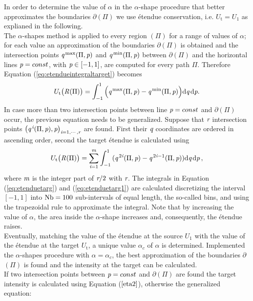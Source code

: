 In order to determine the value of $\alpha$ in the $\alpha$-shape procedure that better approximates the boundaries $\partial$$(\Pi)$ we use \'{e}tendue conservation, i.e. $U_{\textrm{t}}= U_1$ as explianed in the following.\\ \indent
The $\alpha$-shapes method is applied to every region $(\Pi)$ for a range of values of $\alpha$;
   for each value an approximation of the boundaries $\partial$$(\Pi)$ is obtained and
   the intersection points $\textit{q}^{\textrm{\,max}}(\Pi,\textit{p})$ and $\textit{q}^{\textrm{\,min}}(\Pi,\textit{p})$ between $\partial$$(\Pi)$
and the horizontal lines $\textit{p}=const$, with $\textit{p}\in[-1,1]$, are computed for every path $\Pi$.
Therefore Equation (\ref{eq:etendueintegraltarget}) becomes
\begin{equation}\label{eq:etenduetarg}
 U_\textrm{t}\big(\mbox{$\emph{R}_{\textit{}}$}(\Pi)\big)= \int_{-1}^{1}{\Big(\textit{q}^{\textrm{\,max}}(\Pi,\textit{p})-\textit{q}^{\textrm{\,min}}(\Pi,\textit{p})\Big)} \textrm{d}\textit{q}\,\textrm{d}\textit{p}.
\end{equation} In case more than two intersection points between line $\textit{p}=const$ and $\partial$$(\Pi)$ occur, the previous equation needs to be generalized. Suppose that $\textit{r}$ intersection points $\big(\textit{q}^{\,\textit{i}}(\Pi,\textit{p}), \textit{p}\big)_{\textit{i} = 1, \cdots, \textit{r}}$ are found. 
First their $\textit{q}$ coordinates are ordered in ascending order, second the target \'{e}tendue is calculated using
\begin{equation}\label{eq:etenduetarg1}
 U_\textrm{t}\big(\mbox{$\emph{R}_{\textit{}}$}(\Pi)\big) =\sum_{\textit{i} = 1}^{\textit{m}} \int_{-1}^{1}
{(\textit{q}^{\,2\textit{i}}(\Pi,\textit{p})}-{\textit{q}^{\,2\textit{i}-1} (\Pi, \textit{p}) )} \textrm{d}\textit{q}\,\textrm{d}\textit{p}\,,
\end{equation}
where $\textit{m}$ is the integer part of $\textit{r}/2$ with $\textit{r}$. 
The integrals in Equation (\ref{eq:etenduetarg}) and (\ref{eq:etenduetarg1}) are calculated discretizing the interval $[-1, 1]$
   into $\textrm{Nb}=100$ sub-intervals of equal length, the so-called bins, and using the trapezoidal rule to approximate the integral.
   Note that by increasing the value of $\alpha$, the area inside the $\alpha$-shape increases and, consequently, the \'{e}tendue raises.
\\ \indent Eventually, matching the value of the \'{e}tendue at the source $U_1$ with the value of the \'{e}tendue at the target $U_{\textrm{t}}$, a unique value $\alpha_{c}$ of $\alpha$  is determined. Implemented the $\alpha$-shapes procedure with $\alpha = \alpha_c$, the best approximation of the boundaries $\partial$$(\Pi)$ is found and the intensity at the target can be calculated.\\ \indent If two intersection points between $\textit{p}=const$ and $\partial$$(\Pi)$ are found the target intensity is calculated using Equation ($\ref{eta2}$), otherwise the generalized equation:
